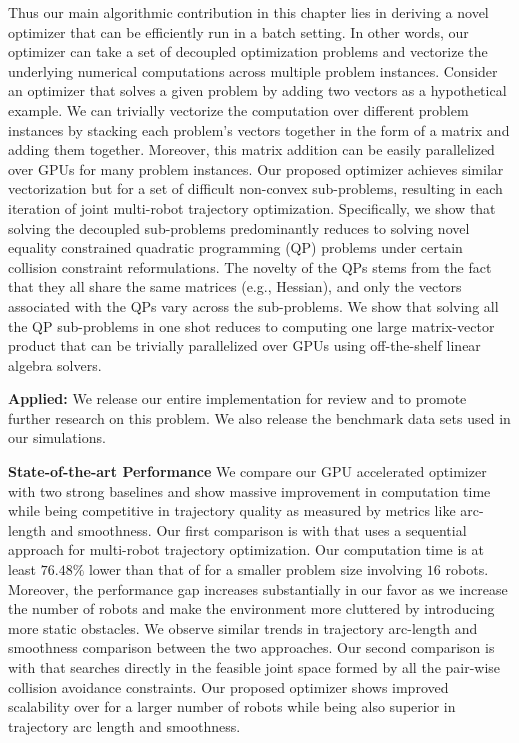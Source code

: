 Thus our main algorithmic contribution in this chapter lies in deriving a novel optimizer that can be efficiently run in a batch setting. In other words, our optimizer can take a set of decoupled optimization problems and vectorize the underlying numerical computations across multiple problem instances. Consider an optimizer that solves a given problem by adding two vectors as a hypothetical example. We can trivially vectorize the computation over different problem instances by stacking each problem's vectors together in the form of a matrix and adding them together. Moreover, this matrix addition can be easily parallelized over GPUs for many problem instances. Our proposed optimizer achieves similar vectorization but for a set of difficult non-convex sub-problems, resulting in each iteration of joint multi-robot trajectory optimization. Specifically, we show that solving the decoupled sub-problems predominantly reduces to solving novel equality constrained quadratic programming (QP) problems under certain collision constraint reformulations. The novelty of the QPs stems from the fact that they all share the same matrices (e.g., Hessian), and only the vectors associated with the QPs vary across the sub-problems. We show that solving all the QP sub-problems in one shot reduces to computing one large matrix-vector product that can be trivially parallelized over GPUs using off-the-shelf linear algebra solvers.  


\noindent \textbf{Applied:} We release our entire implementation for review and to promote further research on this problem. We also release the benchmark data sets used in our simulations.

\noindent \textbf{State-of-the-art Performance} We compare our GPU accelerated optimizer with two strong baselines  \citep{park2020efficient,aks_ral21} and show massive improvement in computation time while being competitive in trajectory quality as measured by metrics like arc-length and smoothness. Our first comparison is with \citep{park2020efficient} that uses a sequential approach for multi-robot trajectory optimization. Our computation time is at least $76.48\%$ lower than that of \citep{park2020efficient} for a smaller problem size involving $16$ robots. Moreover, the performance gap increases substantially in our favor as we increase the number of robots and make the environment more cluttered by introducing more static obstacles. We observe similar trends in trajectory arc-length and smoothness comparison between the two approaches. Our second comparison is with \citep{aks_ral21} that searches directly in the feasible joint space formed by all the pair-wise collision avoidance constraints. Our proposed optimizer shows improved scalability over \citep{aks_ral21} for a larger number of robots while being also superior in trajectory arc length and smoothness.

